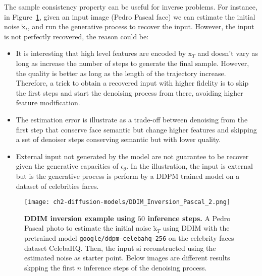 \noindent The sample consistency property can be useful for inverse problems. For instance, in Figure~\ref{fig:ddim-inversion-pascal}, given an input image (Pedro Pascal face) we can estimate the initial noise $\tilde{\mathrm{x}}_{t}$, and run the generative process to recover the input. However, the input is not perfectly recovered, the reason could be:

\begin{itemize}
    \item It is interesting that high level features are encoded by $\mathrm{x}_{T}$ and doesn't vary as long as increase the number of steps to generate the final sample. However, the quality is better as long as the length of the trajectory increase. Therefore, a trick to obtain a recovered input with higher fidelity is to skip the first steps and start the denoising process from there, avoiding higher feature modification.
    \item The estimation error is illustrate as a trade-off between denoising from the first step that conserve face semantic but change higher features and skipping a set of denoiser steps conserving semantic but with lower quality.
    \item External input not generated by the model are not guarantee to be recover given the generative capacities of $\epsilon_{\theta}$. In the illustration, the input is external but is the generative process is perform by a DDPM trained model on a dataset of celebrities faces.
\end{itemize}


\begin{figure}[ht]
    \centering
    \texttt{[image: ch2-diffusion-models/DDIM\_Inversion\_Pascal\_2.png]}
    \captionsetup{width=\textwidth} %
    \caption{\textbf{DDIM inversion example using $50$ inference steps.} A Pedro Pascal photo to estimate the initial noise $\tilde{\mathrm{x}}_T$ using DDIM with the pretrained model \texttt{google/ddpm-celebahq-256} on the celebrity faces dataset CelebaHQ. Then, the input si reconstructed using the estimated noise as starter point. Below images are different results skpping the first $n$ inference steps of the denoising process.}
    \label{fig:ddim-inversion-pascal}
  \end{figure}

